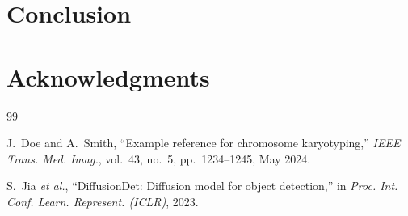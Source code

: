 \documentclass[journal,10pt]{IEEEtran}
\begin{document}
\section{Conclusion}
\label{sec:conclusion}

\section*{Acknowledgments}

%        
%        
\begin{thebibliography}{99}

J.~Doe and A.~Smith, ``Example reference for chromosome karyotyping,''
\emph{IEEE Trans. Med. Imag.}, vol.~43, no.~5, pp.~1234--1245, May 2024.

S.~Jia \emph{et al.}, ``DiffusionDet: Diffusion model for object detection,''
in \emph{Proc. Int. Conf. Learn. Represent. (ICLR)}, 2023.

\end{thebibliography}
\end{document}
